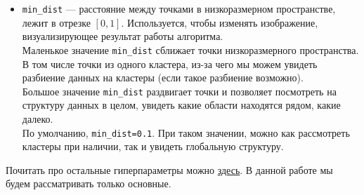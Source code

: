 \begin{itemize}
	\item \verb|min_dist| --- расстояние между точками в низкоразмерном пространстве, лежит в отрезке $[0,1]$. Используется, чтобы изменять изображение, визуализирующее результат работы алгоритма.\\[1mm]	
	Маленькое значение \verb|min_dist| сближает точки низкоразмерного пространства. В том числе точки из одного кластера, из-за чего мы можем увидеть разбиение данных на кластеры (если такое разбиение возможно).\\[1mm]	
	Большое значение \verb|min_dist| раздвигает точки и позволяет посмотреть на структуру данных в целом, увидеть какие области находятся рядом, какие далеко.\\[1mm]	
	По умолчанию, \verb|min_dist=0.1|. При таком значении, можно как рассмотреть кластеры при наличии, так и увидеть глобальную структуру.
\end{itemize}

Почитать про остальные гиперпараметры можно \href{https://umap-learn.readthedocs.io/en/latest/api.html}{здесь}. В данной работе мы будем рассматривать только основные.